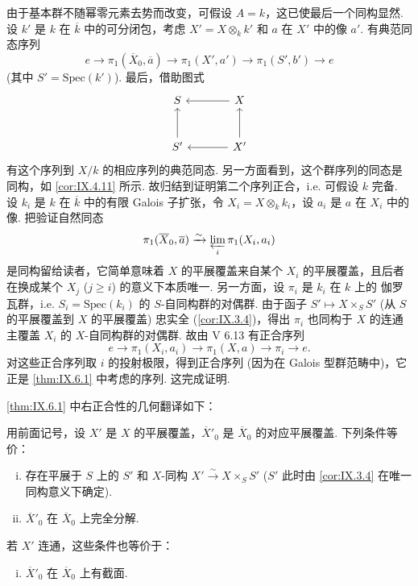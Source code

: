 由于基本群不随幂零元素去势而改变，可假设 $A = k$，这已使最后一个同构显然. 设 $k'$ 是 $k$ 在 $\overline{k}$ 中的可分闭包，考虑 $X' = X \otimes_k k'$ 和 $a$ 在 $X'$ 中的像 $a'$. 有典范同态序列
\[
e \longrightarrow \pi_1(\overline{X}_0, \overline{a}) \longrightarrow \pi_1(X', a') \longrightarrow \pi_1(S', b') \longrightarrow e
\]
(其中 $S' = \mathrm{Spec}(k')$). 最后，借助图式
\[
\begin{tikzcd}[row sep=large, column sep=large]
S & X \arrow[l] \\
S' \arrow[u] & X' \arrow[l] \arrow[u]
\end{tikzcd}
\]
有这个序列到 $X/k$ 的相应序列的典范同态. 另一方面看到，这个群序列的同态是同构，如 \ref{cor:IX.4.11} 所示. 故归结到证明第二个序列正合，i.e. 可假设 $k$ 完备. 设 $k_i$ 是 $k$ 在 $\overline{k}$ 中的有限 Galois 子扩张，令 $X_i = X \otimes_k k_i$，设 $a_i$ 是 $a$ 在 $X_i$ 中的像. 把验证自然同态
\[
\pi_1(\overline{X}_0, \overline{a}) \xrightarrow{\sim} \varprojlim_i \pi_1(X_i, a_i)
\]
是同构留给读者，它简单意味着 $X$ 的平展覆盖来自某个 $X_i$ 的平展覆盖，且后者在换成某个 $X_j$ ($j \geqslant i$) 的意义下本质唯一. 另一方面，设 $\pi_i$ 是 $k_i$ 在 $k$ 上的 伽罗瓦群，i.e. $S_i = \mathrm{Spec}(k_i)$ 的 $S$-自同构群的对偶群. 由于函子 $S' \mapsto X \times_S S'$ (从 $S$ 的平展覆盖到 $X$ 的平展覆盖) 忠实全 (\cref{cor:IX.3.4})，得出 $\pi_i$ 也同构于 $X$ 的连通主覆盖 $X_i$ 的 $X$-自同构群的对偶群. 故由 V 6.13 有正合序列
\[
e \longrightarrow \pi_1(X_i, a_i) \longrightarrow \pi_1(X, a) \longrightarrow \pi_i \longrightarrow e.
\]
对这些正合序列取 $i$ 的投射极限，得到正合序列 (因为在 Galois 型群范畴中)，它正是 \ref{thm:IX.6.1} 中考虑的序列. 这完成证明.

\ref{thm:IX.6.1} 中右正合性的几何翻译如下：

\begin{corollary}\label{cor:IX.6.2}
用前面记号，设 $X'$ 是 $X$ 的平展覆盖，$\overline{X}'_0$ 是 $\overline{X}_0$ 的对应平展覆盖. 下列条件等价：
\begin{enumerate}[i)]
\item 存在平展于 $S$ 上的 $S'$ 和 $X$-同构 $X' \xrightarrow{\sim} X \times_S S'$ ($S'$ 此时由 \ref{cor:IX.3.4} 在唯一同构意义下确定).
\item $\overline{X}'_0$ 在 $\overline{X}_0$ 上完全分解.
\end{enumerate}
若 $X'$ 连通，这些条件也等价于：
\begin{enumerate}[i)]
\item[(ii bis)] $\overline{X}'_0$ 在 $\overline{X}_0$ 上有截面.
\end{enumerate}
\end{corollary}

